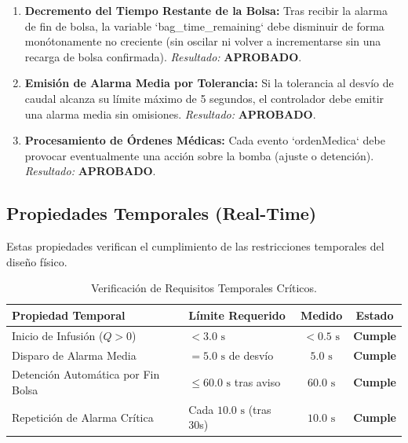 \documentclass[11pt,a4paper]{article}
\begin{document}
\begin{enumerate}
    \item \textbf{Decremento del Tiempo Restante de la Bolsa:}
    Tras recibir la alarma de fin de bolsa, la variable `bag\_time\_remaining` debe disminuir de forma monótonamente no creciente (sin oscilar ni volver a incrementarse sin una recarga de bolsa confirmada).
    \textit{Resultado:} \textbf{APROBADO}.
    
    \item \textbf{Emisión de Alarma Media por Tolerancia:}
    Si la tolerancia al desvío de caudal alcanza su límite máximo de 5 segundos, el controlador debe emitir una alarma media sin omisiones.
    \textit{Resultado:} \textbf{APROBADO}.
    
    \item \textbf{Procesamiento de Órdenes Médicas:}
    Cada evento `ordenMedica` debe provocar eventualmente una acción sobre la bomba (ajuste o detención).
    \textit{Resultado:} \textbf{APROBADO}.
\end{enumerate}

\subsection{Propiedades Temporales (Real-Time)}
Estas propiedades verifican el cumplimiento de las restricciones temporales del diseño físico.

\begin{table}[H]
    \centering
    \begin{tabular}{llcc}
        \toprule
        \textbf{Propiedad Temporal} & \textbf{Límite Requerido} & \textbf{Medido} & \textbf{Estado} \\
        \midrule
        Inicio de Infusión ($Q > 0$) & $< 3.0\text{ s}$ & $< 0.5\text{ s}$ & \textbf{Cumple} \\
        Disparo de Alarma Media & $= 5.0\text{ s}$ de desvío & $5.0\text{ s}$ & \textbf{Cumple} \\
        Detención Automática por Fin Bolsa & $\leq 60.0\text{ s}$ tras aviso & $60.0\text{ s}$ & \textbf{Cumple} \\
        Repetición de Alarma Crítica & Cada $10.0\text{ s}$ (tras 30s) & $10.0\text{ s}$ & \textbf{Cumple} \\
        \bottomrule
    \end{tabular}
    \caption{Verificación de Requisitos Temporales Críticos.}
    \label{tab:requisitos_temporales}
\end{table}
\end{document}
